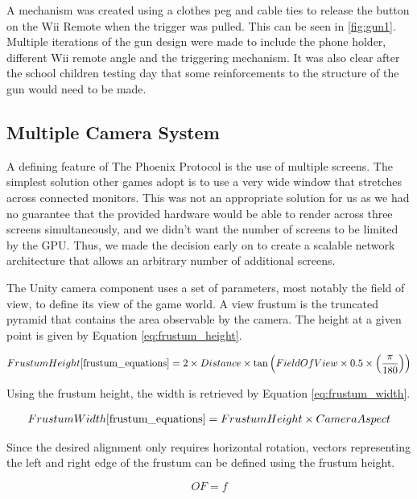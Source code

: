 \documentclass[a4paper,11pt]{article}
\begin{document}
A mechanism was created using a clothes peg and cable ties to release the button on the Wii Remote when the trigger was pulled. This can be seen in \ref{fig:gun1}. Multiple iterations of the gun design were made to include the phone holder, different Wii remote angle and the triggering mechanism. It was also clear after the school children testing day that some reinforcements to the structure of the gun would need to be made. 


\subsection{Multiple Camera System}
A defining feature of The Phoenix Protocol is the use of multiple screens. The simplest solution other games adopt is to use a very wide window that stretches across connected monitors. This was not an appropriate solution for us as we had no guarantee that the provided hardware would be able to render across three screens simultaneously, and we didn't want the number of screens to be limited by the GPU. Thus, we made the decision early on to create a scalable network architecture that allows an arbitrary number of additional screens. 

The Unity camera component\cite{unity_camera} uses a set of parameters, most notably the field of view, to define its view of the game world. A view frustum \cite{unity_frustum} is the truncated pyramid that contains the area observable by the camera. The height at a given point is given by Equation \ref{eq:frustum_height}.

\begin{align}
	Frustum Height\cite{frustum_equations} = 2 \times Distance \times \tan \left( Field Of View \times 0.5 \times \left( \frac{\pi}{180} \right)\right)
    \label{eq:frustum_height}
\end{align}

Using the frustum height, the width is retrieved by Equation \ref{eq:frustum_width}.

\begin{align}
	Frustum Width\cite{frustum_equations} = Frustum Height \times Camera Aspect
    \label{eq:frustum_width}
\end{align}

Since the desired alignment only requires horizontal rotation, vectors representing the left and right edge of the frustum can be defined using the frustum height.

\begin{equation}
	OF = f
	\label{eq:origin_to_far}
\end{equation}
\end{document}
